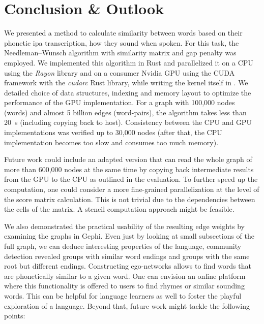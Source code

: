 \section{Conclusion \& Outlook}
\label{sec:conclusion}

We presented a method to calculate similarity between words based on their phonetic \gls{ipa} transcription, \ie how they sound when spoken. For this task, the Needleman–Wunsch algorithm with similarity matrix and gap penalty was employed. We implemented this algorithm in Rust and parallelized it on a CPU using the \textit{Rayon} library and on a consumer Nvidia GPU using the CUDA framework with the \textit{cudarc} Rust library, while writing the kernel itself in \Cpp. We detailed choice of data structures, indexing and memory layout to optimize the performance of the GPU implementation. For a graph with 100,000 nodes (words) and almost 5 billion edges (word-pairs), the algorithm takes less than \qty{20}{\s} (including copying back to host). Consistency between the CPU and GPU implementations was verified up to 30,000 nodes (after that, the CPU implementation becomes too slow and consumes too much memory).

Future work could include an adapted version that can read the whole graph of more than 600,000 nodes at the same time by copying back intermediate results from the GPU to the CPU as outlined in the evaluation. To further speed up the computation, one could consider a more fine-grained parallelization at the level of the score matrix calculation. This is not trivial due to the dependencies between the cells of the matrix. A stencil computation approach might be feasible.

We also demonstrated the practical usability of the resulting edge weights by examining the graphs in Gephi. Even just by looking at small subsections of the full graph, we can deduce interesting properties of the language, \eg community detection revealed groups with similar word endings and groups with the same root but different endings. Constructing ego-networks allows to find words that are phonetically similar to a given word. One can envision an online platform where this functionality is offered to users to find rhymes or similar sounding words. This can be helpful for language learners as well to foster the playful exploration of a language. Beyond that, future work might tackle the following points:

